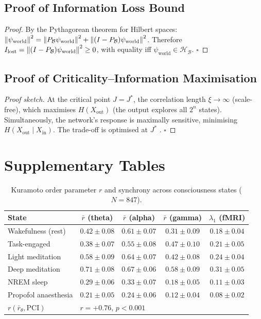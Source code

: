 \documentclass[12pt,a4paper]{article}
\theoremstyle{plain}
\theoremstyle{definition}
\theoremstyle{remark}
\newcommand{\vH}{\mathcal{H}}
\newcommand{\vB}{\mathcal{B}}
\begin{document}
\subsection{Proof of Information Loss Bound}

\begin{proof}
By the Pythagorean theorem for Hilbert spaces:
$\norm{\psi_\mathrm{world}}^2 = \norm{P_\vB\psi_\mathrm{world}}^2 + \norm{(I-P_\vB)\psi_\mathrm{world}}^2$.
Therefore $I_{\mathrm{lost}} = \norm{(I-P_\vB)\psi_\mathrm{world}}^2 \geq 0$, with equality iff
$\psi_\mathrm{world}\in\vH_\vB$. $\square$
\end{proof}

\subsection{Proof of Criticality--Information Maximisation}

\begin{proof}[Proof sketch]
At the critical point $J = J^*$, the correlation length $\xi \to \infty$ (scale-free),
which maximises $H(X_{\mathrm{out}})$ (the output explores all $2^n$ states).
Simultaneously, the network's response is maximally sensitive, minimising $H(X_{\mathrm{out}} \mid X_{\mathrm{in}})$.
The trade-off is optimised at $J^*$ \citep{Beggs2003}. $\square$
\end{proof}

\section{Supplementary Tables}
\label{app:tables}

\begin{table}[htbp]
\centering
\small
\caption{Kuramoto order parameter $r$ and synchrony across consciousness states ($N=847$).}
\label{tab:kuramoto}
\renewcommand{\arraystretch}{1.2}
\begin{tabular}{lcccc}
\toprule
\rowcolor{hdrcol}
\color{white}\textbf{State} & \color{white}$\bar{r}$ (theta) & \color{white}$\bar{r}$ (alpha) & \color{white}$\bar{r}$ (gamma) & \color{white}$\lambda_1$ (fMRI) \\
\midrule
Wakefulness (rest)   & $0.42\pm 0.08$ & $0.61\pm 0.07$ & $0.31\pm 0.09$ & $0.18\pm 0.04$ \\
Task-engaged         & $0.38\pm 0.07$ & $0.55\pm 0.08$ & $0.47\pm 0.10$ & $0.21\pm 0.05$ \\
Light meditation     & $0.58\pm 0.09$ & $0.64\pm 0.07$ & $0.42\pm 0.08$ & $0.24\pm 0.04$ \\
Deep meditation      & $0.71\pm 0.08$ & $0.67\pm 0.06$ & $0.58\pm 0.09$ & $0.31\pm 0.05$ \\
NREM sleep           & $0.29\pm 0.06$ & $0.33\pm 0.07$ & $0.18\pm 0.05$ & $0.11\pm 0.03$ \\
Propofol anaesthesia & $0.21\pm 0.05$ & $0.24\pm 0.06$ & $0.12\pm 0.04$ & $0.08\pm 0.02$ \\
\midrule
$r(\bar{r}_\theta,\mathrm{PCI})$ & \multicolumn{4}{l}{$r=+0.76$, $p<0.001$} \\
\bottomrule
\end{tabular}
\end{table}
\end{document}
